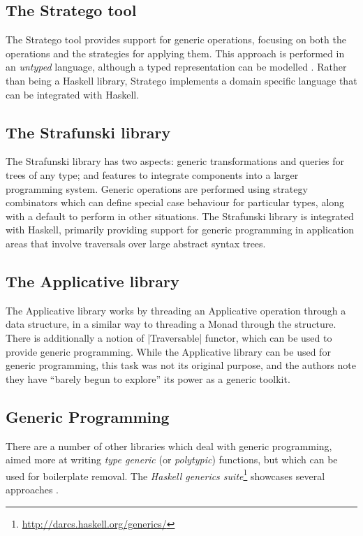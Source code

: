 \subsection{The Stratego tool}

The Stratego tool \citep{stratego} provides support for generic operations, focusing on both the operations and the strategies for applying them. This approach is performed in an \textit{untyped} language, although a typed representation can be modelled \cite{lammel:typed_generic_strategies}. Rather than being a Haskell library, Stratego implements a domain specific language that can be integrated with Haskell.

\subsection{The Strafunski library}

The Strafunski library \citep{strafunski, lammel:polymorphic_symphony} has two aspects: generic transformations and queries for trees of any type; and features to integrate components into a larger programming system. Generic operations are performed using strategy combinators which can define special case behaviour for particular types, along with a default to perform in other situations. The Strafunski library is integrated with Haskell, primarily providing support for generic programming in application areas that involve traversals over large abstract syntax trees.

\subsection{The Applicative library}

The Applicative library \citep{mcbride:applicative} works by threading an Applicative operation through a data structure, in a similar way to threading a Monad through the structure. There is additionally a notion of |Traversable| functor, which can be used to provide generic programming. While the Applicative library can be used for generic programming, this task was not its original purpose, and the authors note they have ``barely begun to explore'' its power as a generic toolkit.

\subsection{Generic Programming}

There are a number of other libraries which deal with generic programming, aimed more at writing \textit{type generic} (or \textit{polytypic}) functions, but which can be used for boilerplate removal. The \textit{Haskell generics suite}\footnote{\url{http://darcs.haskell.org/generics/}} showcases several approaches \citep{weirich:replib,hinze:generics_masses,hinze:generic_haskell}.

